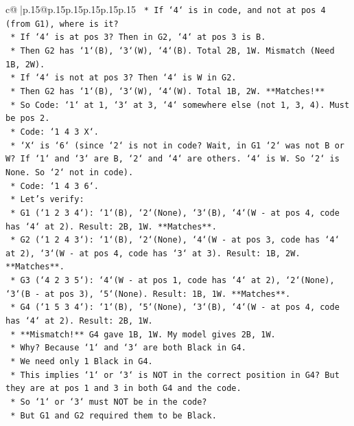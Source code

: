 \documentclass{article}
\begin{document}
{\begin{supertabular}{c@{$\;$}|p{.15\linewidth}@{}p{.15\linewidth}p{.15\linewidth}p{.15\linewidth}p{.15\linewidth}p{.15\linewidth}}
{{{\texttt{    *   If `4` is in code, and not at pos 4 (from G1), where is it?} \\
\texttt{    *   If `4` is at pos 3? Then in G2, `4` at pos 3 is B.} \\
\texttt{    *   Then G2 has `1`(B), `3`(W), `4`(B). Total 2B, 1W. Mismatch (Need 1B, 2W).} \\
\texttt{    *   If `4` is not at pos 3? Then `4` is W in G2.} \\
\texttt{    *   Then G2 has `1`(B), `3`(W), `4`(W). Total 1B, 2W. **Matches!**} \\
\texttt{    *   So Code: `1` at 1, `3` at 3, `4` somewhere else (not 1, 3, 4). Must be pos 2.} \\
\texttt{    *   Code: `1 4 3 X`.} \\
\texttt{    *   `X` is `6` (since `2` is not in code? Wait, in G1 `2` was not B or W? If `1` and `3` are B, `2` and `4` are others. `4` is W. So `2` is None. So `2` not in code).} \\
\texttt{    *   Code: `1 4 3 6`.} \\
\texttt{    *   Let's verify:} \\
\texttt{        *   G1 (`1 2 3 4`): `1`(B), `2`(None), `3`(B), `4`(W {-} at pos 4, code has `4` at 2). Result: 2B, 1W. **Matches**.} \\
\texttt{        *   G2 (`1 2 4 3`): `1`(B), `2`(None), `4`(W {-} at pos 3, code has `4` at 2), `3`(W {-} at pos 4, code has `3` at 3). Result: 1B, 2W. **Matches**.} \\
\texttt{        *   G3 (`4 2 3 5`): `4`(W {-} at pos 1, code has `4` at 2), `2`(None), `3`(B {-} at pos 3), `5`(None). Result: 1B, 1W. **Matches**.} \\
\texttt{        *   G4 (`1 5 3 4`): `1`(B), `5`(None), `3`(B), `4`(W {-} at pos 4, code has `4` at 2). Result: 2B, 1W.} \\
\texttt{        *   **Mismatch!** G4 gave 1B, 1W. My model gives 2B, 1W.} \\
\texttt{        *   Why? Because `1` and `3` are both Black in G4.} \\
\texttt{        *   We need only 1 Black in G4.} \\
\texttt{        *   This implies `1` or `3` is NOT in the correct position in G4? But they are at pos 1 and 3 in both G4 and the code.} \\
\texttt{        *   So `1` or `3` must NOT be in the code?} \\
\texttt{        *   But G1 and G2 required them to be Black.} \\
}}}
\end{supertabular}}
\end{document}
